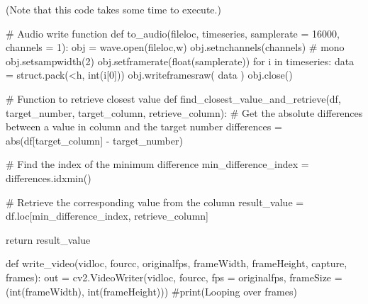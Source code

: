 \documentclass[
  letterpaper,
  DIV=11,
  numbers=noendperiod]{scrreprt}
\newenvironment{Shaded}{\begin{snugshade}}{\end{snugshade}}
\newcommand{\BuiltInTok}[1]{\textcolor[rgb]{0.00,0.23,0.31}{#1}}
\newcommand{\CommentTok}[1]{\textcolor[rgb]{0.37,0.37,0.37}{#1}}
\newcommand{\ControlFlowTok}[1]{\textcolor[rgb]{0.00,0.23,0.31}{#1}}
\newcommand{\DecValTok}[1]{\textcolor[rgb]{0.68,0.00,0.00}{#1}}
\newcommand{\KeywordTok}[1]{\textcolor[rgb]{0.00,0.23,0.31}{#1}}
\newcommand{\NormalTok}[1]{\textcolor[rgb]{0.00,0.23,0.31}{#1}}
\newcommand{\OperatorTok}[1]{\textcolor[rgb]{0.37,0.37,0.37}{#1}}
\newcommand{\StringTok}[1]{\textcolor[rgb]{0.13,0.47,0.30}{#1}}
\begin{document}
(Note that this code takes some time to execute.)

\begin{Shaded}
\begin{Highlighting}[]
\CommentTok{\# Audio write function}
\KeywordTok{def}\NormalTok{ to\_audio(fileloc, timeseries, samplerate }\OperatorTok{=} \DecValTok{16000}\NormalTok{, channels }\OperatorTok{=} \DecValTok{1}\NormalTok{):}
\NormalTok{    obj }\OperatorTok{=}\NormalTok{ wave.}\BuiltInTok{open}\NormalTok{(fileloc,}\StringTok{\textquotesingle{}w\textquotesingle{}}\NormalTok{)}
\NormalTok{    obj.setnchannels(channels) }\CommentTok{\# mono}
\NormalTok{    obj.setsampwidth(}\DecValTok{2}\NormalTok{)}
\NormalTok{    obj.setframerate(}\BuiltInTok{float}\NormalTok{(samplerate))}
    \ControlFlowTok{for}\NormalTok{ i }\KeywordTok{in}\NormalTok{ timeseries:}
\NormalTok{        data }\OperatorTok{=}\NormalTok{ struct.pack(}\StringTok{\textquotesingle{}\textless{}h\textquotesingle{}}\NormalTok{, }\BuiltInTok{int}\NormalTok{(i[}\DecValTok{0}\NormalTok{]))}
\NormalTok{        obj.writeframesraw( data )}
\NormalTok{    obj.close()}

\CommentTok{\# Function to retrieve closest value}
\KeywordTok{def}\NormalTok{ find\_closest\_value\_and\_retrieve(df, target\_number, target\_column, retrieve\_column):}
    \CommentTok{\# Get the absolute differences between a value in column and the target number}
\NormalTok{    differences }\OperatorTok{=} \BuiltInTok{abs}\NormalTok{(df[target\_column] }\OperatorTok{{-}}\NormalTok{ target\_number)}
    
    \CommentTok{\# Find the index of the minimum difference}
\NormalTok{    min\_difference\_index }\OperatorTok{=}\NormalTok{ differences.idxmin()}
    
    \CommentTok{\# Retrieve the corresponding value from the column}
\NormalTok{    result\_value }\OperatorTok{=}\NormalTok{ df.loc[min\_difference\_index, retrieve\_column]}

    \ControlFlowTok{return}\NormalTok{ result\_value}

\KeywordTok{def}\NormalTok{ write\_video(vidloc, fourcc, originalfps, frameWidth, frameHeight, capture, frames):}
\NormalTok{    out }\OperatorTok{=}\NormalTok{ cv2.VideoWriter(vidloc, fourcc, fps }\OperatorTok{=}\NormalTok{ originalfps, frameSize }\OperatorTok{=}\NormalTok{ (}\BuiltInTok{int}\NormalTok{(frameWidth), }\BuiltInTok{int}\NormalTok{(frameHeight)))}
    \CommentTok{\#print(\textquotesingle{}Looping over frames\textquotesingle{})}


\end{Highlighting}
\end{Shaded}
\end{document}
